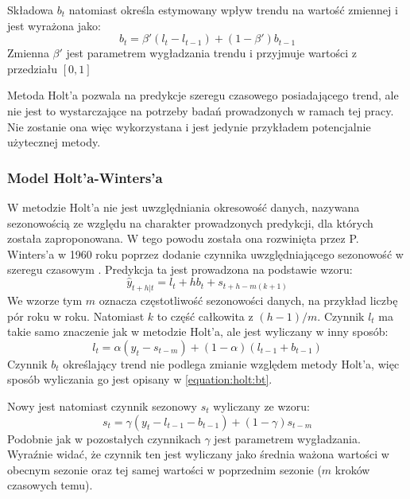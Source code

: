 \documentclass[10pt,a4paper]{article}
\begin{document}
Składowa $b_t$ natomiast określa estymowany wpływ trendu na wartość zmiennej i jest wyrażona jako:
\begin{equation}
	b_t = \beta'(l_t - l_{t-1}) + (1 - \beta')b_{t-1}
	\label{equation:holt:bt}
\end{equation}
Zmienna $\beta'$ jest parametrem wygładzania trendu i przyjmuje wartości z przedziału $[0,1]$

Metoda Holt'a pozwala na predykcje szeregu czasowego posiadającego trend, ale nie jest to wystarczające na potrzeby badań prowadzonych w ramach tej pracy. Nie zostanie ona więc wykorzystana i jest jedynie przykładem potencjalnie użytecznej metody. 

\subsubsection{Model Holt'a-Winters'a}
\label{subsection:holt-winters}
W metodzie Holt'a nie jest uwzględniania okresowość danych, nazywana sezonowością ze względu na charakter prowadzonych predykcji, dla których została zaproponowana. W tego powodu została ona rozwinięta przez P. Winters'a w 1960 roku poprzez dodanie czynnika uwzględniającego sezonowość w szeregu czasowym \cite{winters1960forecasting}. Predykcja ta jest prowadzona na podstawie wzoru:
\begin{equation}
	\hat{y}_{t+h|t} = l_t + hb_t + s_{t + h - m(k+1)}
\end{equation}
We wzorze tym $m$ oznacza częstotliwość sezonowości danych, na przykład liczbę pór roku w roku. Natomiast $k$ to część całkowita z $(h-1)/m$. Czynnik $l_t$ ma takie samo znaczenie jak w metodzie Holt'a, ale jest wyliczany w inny sposób:
\begin{equation}
	l_t = \alpha(y_t - s_{t-m}) + (1 - \alpha)(l_{t-1} + b_{t-1})
\end{equation}
Czynnik $b_t$ określający trend nie podlega zmianie względem metody Holt'a, więc sposób wyliczania go jest opisany w \autoref{equation:holt:bt}.

Nowy jest natomiast czynnik sezonowy $s_t$ wyliczany ze wzoru: 
\begin{equation}
	s_t = \gamma(y_t - l_{t-1} - b_{t-1}) + (1-\gamma)s_{t-m}
\end{equation}
Podobnie jak w pozostałych czynnikach $\gamma$ jest parametrem wygładzania. Wyraźnie widać, że czynnik ten jest wyliczany jako średnia ważona wartości w obecnym sezonie oraz tej samej wartości w poprzednim sezonie ($m$ kroków czasowych temu).
\end{document}
